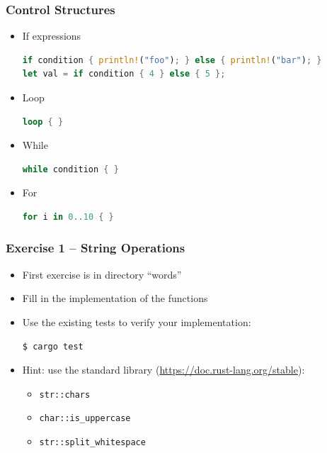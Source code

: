 \begin{frame}[fragile]
    \frametitle{Control Structures}

    \begin{itemize}
        \item If expressions
    \begin{lstlisting}[language=rust]
if condition { println!("foo"); } else { println!("bar"); }
let val = if condition { 4 } else { 5 };
    \end{lstlisting}
        \item Loop
    \begin{lstlisting}[language=rust]
loop { }
    \end{lstlisting}
        \item While
    \begin{lstlisting}[language=rust]
while condition { }
    \end{lstlisting}
        \item For
    \begin{lstlisting}[language=rust]
for i in 0..10 { }
    \end{lstlisting}
    \end{itemize}
\end{frame}

\begin{frame}[fragile]
    \frametitle{Exercise 1 -- String Operations}

    \begin{itemize}
        \item First exercise is in directory ``words''
        \item Fill in the implementation of the functions
        \item Use the existing tests to verify your implementation:
    \begin{lstlisting}[language=bash]
$ cargo test
    \end{lstlisting}
        \item Hint: use the standard library (\url{https://doc.rust-lang.org/stable}):
        \begin{itemize}
            \item \texttt{str::chars}
            \item \texttt{char::is\_uppercase}
            \item \texttt{str::split\_whitespace}
        \end{itemize}
    \end{itemize}
\end{frame}
